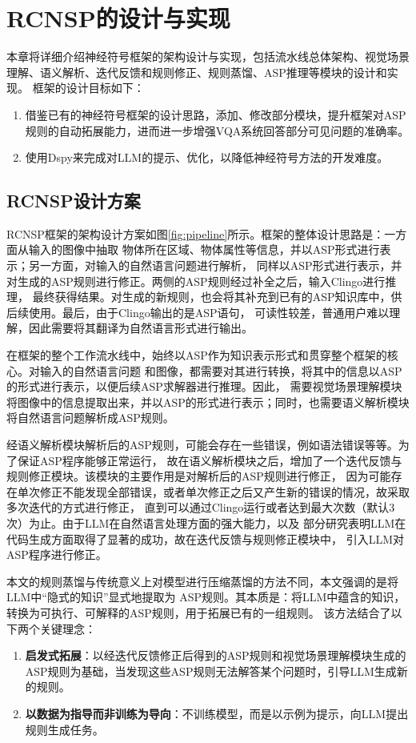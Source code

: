 \chapter{RCNSP的设计与实现}
本章将详细介绍神经符号框架的架构设计与实现，包括流水线总体架构、视觉场景理解、语义解析、迭代反馈和规则修正、规则蒸馏、ASP推理等模块的设计和实现。
框架的设计目标如下：
\begin{enumerate}[label=(\arabic*),itemsep=0pt,parsep=0pt]
\item 借鉴已有的神经符号框架的设计思路，添加、修改部分模块，提升框架对ASP规则的自动拓展能力，进而进一步增强VQA系统回答部分可见问题的准确率。
\item 使用Dspy来完成对LLM的提示、优化，以降低神经符号方法的开发难度。
\end{enumerate}
\section{RCNSP设计方案}
RCNSP框架的架构设计方案如图\ref{fig:pipeline}所示。框架的整体设计思路是：一方面从输入的图像中抽取
物体所在区域、物体属性等信息，并以ASP形式进行表示；另一方面，对输入的自然语言问题进行解析，
同样以ASP形式进行表示，并对生成的ASP规则进行修正。两侧的ASP规则经过补全之后，输入Clingo进行推理，
最终获得结果。对生成的新规则，也会将其补充到已有的ASP知识库中，供后续使用。最后，由于Clingo输出的是ASP语句，
可读性较差，普通用户难以理解，因此需要将其翻译为自然语言形式进行输出。

在框架的整个工作流水线中，始终以ASP作为知识表示形式和贯穿整个框架的核心。对输入的自然语言问题
和图像，都需要对其进行转换，将其中的信息以ASP的形式进行表示，以便后续ASP求解器进行推理。因此，
需要视觉场景理解模块将图像中的信息提取出来，并以ASP的形式进行表示；同时，也需要语义解析模块
将自然语言问题解析成ASP规则。

经语义解析模块解析后的ASP规则，可能会存在一些错误，例如语法错误等等。为了保证ASP程序能够正常运行，
故在语义解析模块之后，增加了一个迭代反馈与规则修正模块。该模块的主要作用是对解析后的ASP规则进行修正，
因为可能存在单次修正不能发现全部错误，或者单次修正之后又产生新的错误的情况，故采取多次迭代的方式进行修正，
直到可以通过Clingo运行或者达到最大次数（默认3次）为止。由于LLM在自然语言处理方面的强大能力，以及
部分研究表明LLM在代码生成方面取得了显著的成功\cite{gao2023pal,he2023solving}，故在迭代反馈与规则修正模块中，
引入LLM对ASP程序进行修正。

本文的规则蒸馏与传统意义上对模型进行压缩蒸馏的方法不同，本文强调的是将LLM中“隐式的知识”显式地提取为
ASP规则。其本质是：将LLM中蕴含的知识，转换为可执行、可解释的ASP规则，用于拓展已有的一组规则。
该方法结合了以下两个关键理念：
\begin{enumerate}[itemsep=0pt,parsep=0pt]
\item \textbf{启发式拓展}：以经迭代反馈修正后得到的ASP规则和视觉场景理解模块生成的ASP规则为基础，当发现这些ASP规则无法解答某个问题时，引导LLM生成新的规则。
\item \textbf{以数据为指导而非训练为导向}：不训练模型，而是以示例为提示，向LLM提出规则生成任务。
\end{enumerate}

